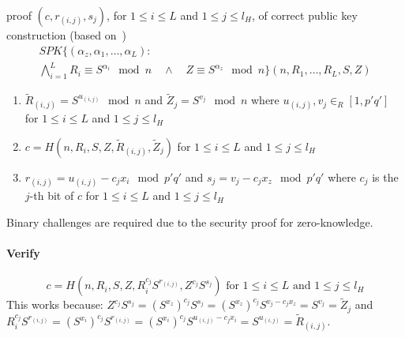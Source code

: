 proof $(c, r_{(i,j)}, s_j)$, for $1 \leq i \leq L$ and $1 \leq j \leq l_H$, of
correct public key construction (based on~\cite[Appendix A]{BrickellCC2004})
\begin{multline*}
  SPK \{ (\alpha_z, \alpha_1, \dots, \alpha_L) : \\
  \bigwedge_{i = 1}^{L} R_i \equiv S^{\alpha_i} \mod n
  \quad\land\quad
  Z \equiv S^{\alpha_z} \mod n
  \} (n, R_1, \dots, R_L, S, Z)
\end{multline*}
\begin{enumerate}
  \item $\tilde{R}_{(i,j)} = S^{u_{(i,j)}} \mod n$ and
    $\tilde{Z}_j = S^{v_j} \mod n$ where
    $u_{(i,j)}, v_j \in_R [1,p'q']$ for
    $1 \leq i \leq L$ and $1 \leq j \leq l_H$
  \item $c = H(n, R_i, S, Z, \tilde{R}_{(i,j)}, \tilde{Z}_j)$ for
    $1 \leq i \leq L$ and $1 \leq j \leq l_H$
  \item $r_{(i,j)} = u_{(i,j)} - c_j x_i \mod p'q'$ and
    $s_j = v_j - c_j x_z \mod p'q'$ where $c_j$ is the $j$-th bit of $c$ for
    $1 \leq i \leq L$ and $1 \leq j \leq l_H$
\end{enumerate}
Binary challenges are required due to the security proof for zero-knowledge.
%
%
\paragraph{Verify}
\begin{equation*}
  c = H(n, R_i, S, Z, R_i^{c_j} S^{r_{(i,j)}}, Z^{c_j} S^{s_j}) \text{ for }
  1 \leq i \leq L \text{ and } 1 \leq j \leq l_H
\end{equation*}
This works because: $Z^{c_j} S^{s_j} = (S^{x_z})^{c_j} S^{s_j} = (S^{x_z})^{c_j} S^{v_j - c_j x_z} = S^{v_j} = \tilde{Z}_j$
and $R_i^{c_j} S^{r_{(i,j)}} = (S^{x_i})^{c_j} S^{r_{(i,j)}} = (S^{x_i})^{c_j} S^{u_{(i,j)}-c_j x_i} = S^{u_{(i,j)}} = \tilde{R}_{(i,j)}$.

